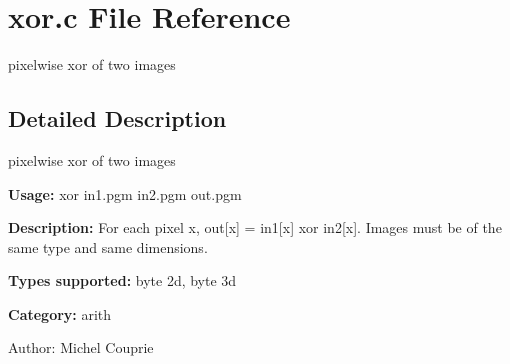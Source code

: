 \section{xor.c File Reference}
\label{xor_8c}
pixelwise xor of two images 



\subsection{Detailed Description}
pixelwise xor of two images 

{\bf Usage:} xor in1.pgm in2.pgm out.pgm

{\bf Description:} For each pixel x, out[x] = in1[x] xor in2[x]. Images must be of the same type and same dimensions.

{\bf Types supported:} byte 2d, byte 3d

{\bf Category:} arith

\begin{Desc}
\item[Author:]Michel Couprie \end{Desc}
